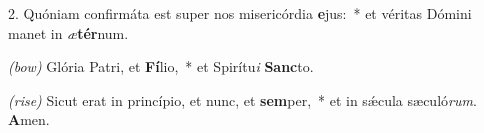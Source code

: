 2. Quóniam confirmáta est super nos misericórdia \textbf{e}jus:~* et véritas Dómini manet in \textit{æ}\textbf{tér}num.

\textit{(bow)} Glória Patri, et \textbf{Fí}lio,~* et Spirítu\textit{i} \textbf{Sanc}to.

\textit{(rise)} Sicut erat in princípio, et nunc, et \textbf{sem}per,~* et in s\'{\ae}cula sæculó\textit{rum}. \textbf{A}men.
